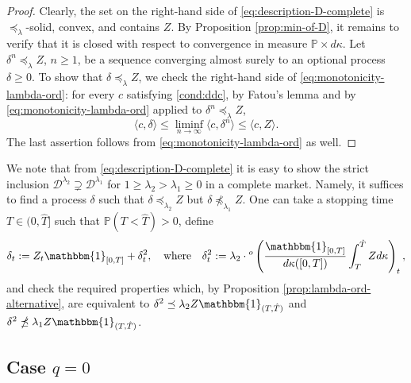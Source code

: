 \documentclass[11pt, oneside]{article}   	%
\theoremstyle{plain}
\theoremstyle{definition}
\theoremstyle{remark}
\begin{document}
\begin{proof}
Clearly, the set on the right-hand side of \eqref{eq:description-D-complete} is $\preceq_\lambda$-solid, convex, and contains $Z$. By Proposition \ref{prop:min-of-D}, it remains to verify that it is closed with respect to convergence in measure $\mathbb{P}\times d\kappa$. Let $\delta^n\preceq_\lambda Z$, $n\geq 1$, be a sequence converging almost surely to an optional process $\delta\geq 0$. To show that $\delta\preceq_\lambda Z$, we check the right-hand side of \eqref{eq:monotonicity-lambda-ord}: for every $c$ satisfying \eqref{cond:ddc}, by Fatou's lemma and by \eqref{eq:monotonicity-lambda-ord} applied to $\delta^n\preceq_\lambda Z$,
$$\langle c, \delta \rangle\leq\liminf_{n\to\infty}\langle c, \delta^n \rangle\leq\langle c, Z\rangle.$$
The last assertion follows from \eqref{eq:monotonicity-lambda-ord} as well.
\end{proof}

We note that from \eqref{eq:description-D-complete} it is easy to show the strict inclusion $\mathcal{D}^{\lambda_2}\supsetneq\mathcal{D}^{\lambda_1}$ for $1\geq\lambda_2>\lambda_1\geq0$ in a complete market. Namely, it suffices to find a process $\delta$ such that $\delta\preceq_{\lambda_2}Z$ but $\delta\npreceq_{\lambda_1}Z$. One can take a stopping time $T\in(0,\hat{T}]$ such that $\mathbb{P}(T<\hat{T})>0$, define
$$\delta_t:=Z_t\mathbbm{1}_{[0,T]}+\delta^2_t,\quad \text{where}\quad\delta^2_t:=\lambda_2\cdot{}^o\left(\frac{\mathbbm{1}_{[0,T]}}{d\kappa([0,T])}\int_{T}^{\hat{T}}Z d\kappa\right)_t,$$
and check the required properties which, by Proposition \ref{prop:lambda-ord-alternative}, are equivalent to $\delta^2\preceq \lambda_2 Z\mathbbm{1}_{(T,\hat{T})}$ and $\delta^2\npreceq \lambda_1 Z\mathbbm{1}_{(T,\hat{T})}$.

\subsection{Case $q=0$}
\end{document}
